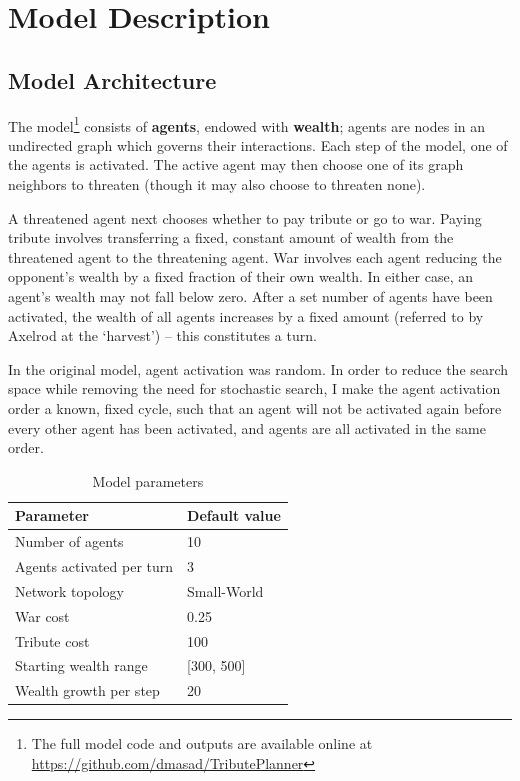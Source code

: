 \documentclass{article}
\begin{document}
\section{Model Description}

\subsection{Model Architecture}

The model\footnote{The full model code and outputs are available online at \url{https://github.com/dmasad/TributePlanner}} consists of \textbf{agents}, endowed with \textbf{wealth}; agents are nodes in an undirected graph which governs their interactions. Each step of the model, one of the agents is activated. The active agent may then choose one of its graph neighbors to threaten (though it may also choose to threaten none).

A threatened agent next chooses whether to pay tribute or go to war. Paying tribute involves transferring a fixed, constant amount of wealth from the threatened agent to the threatening agent. War involves each agent reducing the opponent's wealth by a fixed fraction of their own wealth. In either case, an agent's wealth may not fall below zero. After a set number of agents have been activated, the wealth of all agents increases by a fixed amount (referred to by Axelrod at the `harvest') -- this constitutes a turn.

In the original model, agent activation was random. In order to reduce the search space while removing the need for stochastic search, I make the agent activation order a known, fixed cycle, such that an agent will not be activated again before every other agent has been activated, and agents are all activated in the same order.

\begin{table}[h]
\begin{tabular}{@{}ll@{}}
\toprule
\textbf{Parameter}               & \textbf{Default value}                            \\ \midrule
Number of agents       & 10                                       \\
Agents activated per turn       & 3                                       \\
Network topology       & Small-World                              \\
War cost               & 0.25                                     \\
Tribute cost           & 100                                      \\
Starting wealth range        &  {[}300, 500{]} \\
Wealth growth per step & 20                                      \\ \bottomrule
\end{tabular}
\caption{Model parameters}
\end{table}
\end{document}
